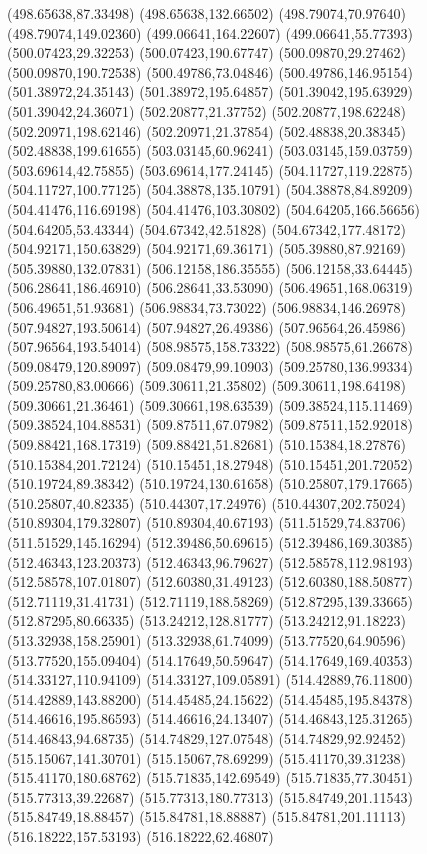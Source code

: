 {(498.65638,87.33498) (498.65638,132.66502) (498.79074,70.97640) (498.79074,149.02360) (499.06641,164.22607) (499.06641,55.77393) (500.07423,29.32253) (500.07423,190.67747)
(500.09870,29.27462) (500.09870,190.72538) (500.49786,73.04846) (500.49786,146.95154) (501.38972,24.35143) (501.38972,195.64857) (501.39042,195.63929) (501.39042,24.36071)
(502.20877,21.37752) (502.20877,198.62248) (502.20971,198.62146) (502.20971,21.37854) (502.48838,20.38345) (502.48838,199.61655) (503.03145,60.96241) (503.03145,159.03759)
(503.69614,42.75855) (503.69614,177.24145) (504.11727,119.22875) (504.11727,100.77125) (504.38878,135.10791) (504.38878,84.89209) (504.41476,116.69198) (504.41476,103.30802)
(504.64205,166.56656) (504.64205,53.43344) (504.67342,42.51828) (504.67342,177.48172) (504.92171,150.63829) (504.92171,69.36171) (505.39880,87.92169) (505.39880,132.07831)
(506.12158,186.35555) (506.12158,33.64445) (506.28641,186.46910) (506.28641,33.53090) (506.49651,168.06319) (506.49651,51.93681) (506.98834,73.73022) (506.98834,146.26978)
(507.94827,193.50614) (507.94827,26.49386) (507.96564,26.45986) (507.96564,193.54014) (508.98575,158.73322) (508.98575,61.26678) (509.08479,120.89097) (509.08479,99.10903)
(509.25780,136.99334) (509.25780,83.00666) (509.30611,21.35802) (509.30611,198.64198) (509.30661,21.36461) (509.30661,198.63539) (509.38524,115.11469) (509.38524,104.88531)
(509.87511,67.07982) (509.87511,152.92018) (509.88421,168.17319) (509.88421,51.82681) (510.15384,18.27876) (510.15384,201.72124) (510.15451,18.27948) (510.15451,201.72052)
(510.19724,89.38342) (510.19724,130.61658) (510.25807,179.17665) (510.25807,40.82335) (510.44307,17.24976) (510.44307,202.75024) (510.89304,179.32807) (510.89304,40.67193)
(511.51529,74.83706) (511.51529,145.16294) (512.39486,50.69615) (512.39486,169.30385) (512.46343,123.20373) (512.46343,96.79627) (512.58578,112.98193) (512.58578,107.01807)
(512.60380,31.49123) (512.60380,188.50877) (512.71119,31.41731) (512.71119,188.58269) (512.87295,139.33665) (512.87295,80.66335) (513.24212,128.81777) (513.24212,91.18223)
(513.32938,158.25901) (513.32938,61.74099) (513.77520,64.90596) (513.77520,155.09404) (514.17649,50.59647) (514.17649,169.40353) (514.33127,110.94109) (514.33127,109.05891)
(514.42889,76.11800) (514.42889,143.88200) (514.45485,24.15622) (514.45485,195.84378) (514.46616,195.86593) (514.46616,24.13407) (514.46843,125.31265) (514.46843,94.68735)
(514.74829,127.07548) (514.74829,92.92452) (515.15067,141.30701) (515.15067,78.69299) (515.41170,39.31238) (515.41170,180.68762) (515.71835,142.69549) (515.71835,77.30451)
(515.77313,39.22687) (515.77313,180.77313) (515.84749,201.11543) (515.84749,18.88457) (515.84781,18.88887) (515.84781,201.11113) (516.18222,157.53193) (516.18222,62.46807)
}
